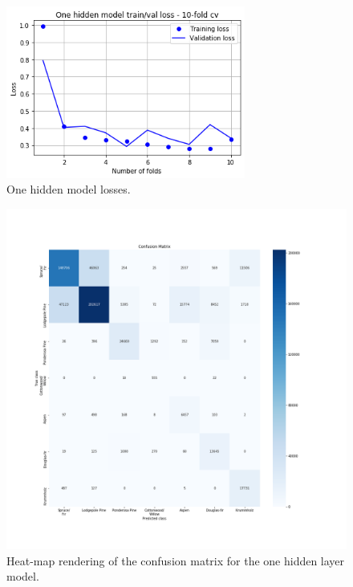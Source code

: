 \begin{figure}
\centering
\includegraphics[width=0.7\textwidth]{./TeX_files/img/onehiddenmodelloss.png}
\caption{One hidden model losses.}
\label{fig:onehiddenmodelloss}
\end{figure}
\begin{figure}
\centering
\includegraphics[width=\textwidth]{./TeX_files/img/onehiddenconfmatheatmap.png}
\caption{Heat-map rendering of the confusion matrix for the one hidden layer model.}
\label{fig:onehiddenconfmatheatmap}
\end{figure}
